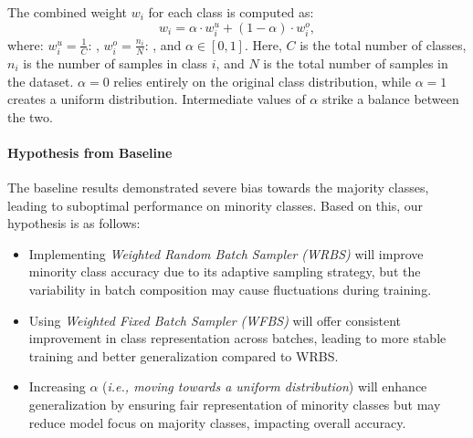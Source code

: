 The combined weight \( w_i \) for each class is computed as:
\begin{equation}
w_i = \alpha \cdot w_i^{u} + (1 - \alpha) \cdot w_i^{o},
\end{equation}
where: $w_i^{u} = \frac{1}{C}$: , $w_i^{o} = \frac{n_i}{N}$: , and $\alpha \in [0, 1]$.
Here, \(C\) is the total number of classes, \(n_i\) is the number of samples in class \(i\), and \(N\) is the total number of samples in the dataset. \(\alpha = 0\) relies entirely on the original class distribution, while \(\alpha = 1\) creates a uniform distribution. Intermediate values of \(\alpha\) strike a balance between the two.


\paragraph{Hypothesis from Baseline}
The baseline results demonstrated severe bias towards the majority classes, leading to suboptimal performance on minority classes. Based on this, our hypothesis is as follows:
\begin{itemize}
    \item Implementing \textit{Weighted Random Batch Sampler (WRBS)} will improve minority class accuracy due to its adaptive sampling strategy, but the variability in batch composition may cause fluctuations during training.
    \item Using \textit{Weighted Fixed Batch Sampler (WFBS)} will offer consistent improvement in class representation across batches, leading to more stable training and better generalization compared to WRBS.
    \item Increasing \(\alpha\) (\textit{i.e., moving towards a uniform distribution}) will enhance generalization by ensuring fair representation of minority classes but may reduce model focus on majority classes, impacting overall accuracy.
\end{itemize}

\newcommand{\valpm}[2]{%
  \ensuremath{#1\,{\scriptstyle\pm}\,#2}%
}


